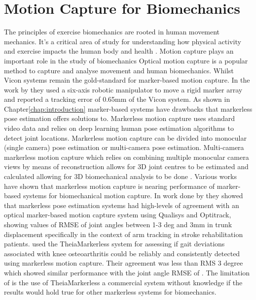 \section{Motion Capture for Biomechanics}

The principles of exercise biomechanics are rooted in human movement mechanics. It's a critical area of study for understanding how physical activity and exercise impacts the human body and health \cite{forte2023biomechanics}.
Motion capture plays an important role in the study of biomechanics \cite{mundermann2006evolution}
Optical motion capture is a popular method to capture and analyse movement and human biomechanics. 
Whilst Vicon systems remain the gold-standard \cite{colyer2018review} for marker-based motion capture. In the work by \citet{chromy2025validated} they used a six-axis robotic manipulator to move a rigid marker array and reported a tracking error of 0.65mm of the Vicon system. As shown in Chapter\ref{chap:introduction} marker-based systems have drawbacks that markerless pose estimation offers solutions to. Markerless motion capture uses standard video data and relies on deep learning human pose estimation algorithms to detect joint locations. Markerless motion capture can be divided into monocular (single camera) pose estimation  or multi-camera pose estimation. Multi-camera markerless motion capture which relies on combining multiple monocular camera views by means of reconstruction allows for 3D joint centres to be estimated and calculated allowing for 3D biomechanical analysis to be done \cite{wade2022applications}. 
Various works have shown that markerless motion capture is nearing performance of marker-based systems for biomechanical motion capture. 
In work done by \citet{unger2025differentiable} they showed that markerless pose estimation systems had high-levels of agreement with an optical marker-based motion capture system using Qualisys and Optitrack, showing values of RMSE of joint angles between 1-3 deg and 3mm in trunk displacement specifically in the context of arm tracking in stroke rehabilitation patients.
\citet{outerleys2025clinical} used the TheiaMarkerless system for assessing if gait deviations associated with knee osteoarthritis could be reliably and consistently detected using markerless motion capture. Their agreement was less than RMS 3 degree which showed similar performance with the joint angle RMSE of \citet{unger2025differentiable}. The limitation of \citet{outerleys2025clinical} is the use of TheiaMarkerless a commercial system without knowledge if the results would hold true for other markerless systems for biomechanics.
